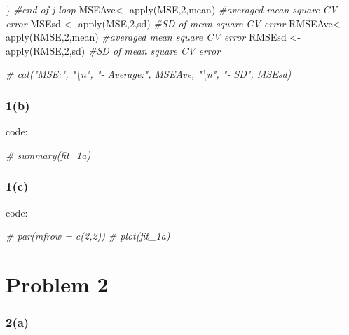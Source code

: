 \documentclass[
]{article}
\newenvironment{Shaded}{\begin{snugshade}}{\end{snugshade}}
\newcommand{\CommentTok}[1]{\textcolor[rgb]{0.56,0.35,0.01}{\textit{#1}}}
\newcommand{\DecValTok}[1]{\textcolor[rgb]{0.00,0.00,0.81}{#1}}
\newcommand{\FunctionTok}[1]{\textcolor[rgb]{0.00,0.00,0.00}{#1}}
\newcommand{\NormalTok}[1]{#1}
\newcommand{\OtherTok}[1]{\textcolor[rgb]{0.56,0.35,0.01}{#1}}
\begin{document}
\begin{Shaded}
\begin{Highlighting}[]
\NormalTok{\} }\CommentTok{\#end of j loop}
\NormalTok{MSEAve}\OtherTok{\textless{}{-}} \FunctionTok{apply}\NormalTok{(MSE,}\DecValTok{2}\NormalTok{,mean) }\CommentTok{\#averaged mean square CV error}
\NormalTok{MSEsd }\OtherTok{\textless{}{-}} \FunctionTok{apply}\NormalTok{(MSE,}\DecValTok{2}\NormalTok{,sd)   }\CommentTok{\#SD of mean square CV error}
\NormalTok{RMSEAve}\OtherTok{\textless{}{-}} \FunctionTok{apply}\NormalTok{(RMSE,}\DecValTok{2}\NormalTok{,mean) }\CommentTok{\#averaged mean square CV error}
\NormalTok{RMSEsd }\OtherTok{\textless{}{-}} \FunctionTok{apply}\NormalTok{(RMSE,}\DecValTok{2}\NormalTok{,sd)   }\CommentTok{\#SD of mean square CV error}

\CommentTok{\# cat("MSE:", "\textbackslash{}n", "{-} Average:", MSEAve, "\textbackslash{}n", "{-} SD", MSEsd)}
\end{Highlighting}
\end{Shaded}

\hypertarget{b-4}{%
\subsubsection{1(b)}\label{b-4}}

code:

\begin{Shaded}
\begin{Highlighting}[]
\CommentTok{\# summary(fit\_1a)}
\end{Highlighting}
\end{Shaded}

\hypertarget{c-4}{%
\subsubsection{1(c)}\label{c-4}}

code:

\begin{Shaded}
\begin{Highlighting}[]
\CommentTok{\# par(mfrow = c(2,2))}
\CommentTok{\# plot(fit\_1a)}
\end{Highlighting}
\end{Shaded}

\hypertarget{problem-2-1}{%
\section{Problem 2}\label{problem-2-1}}

\hypertarget{a-5}{%
\subsubsection{2(a)}\label{a-5}}
\end{document}
